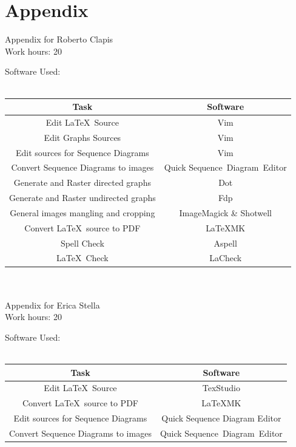 \documentclass{article}
\begin{document}
\section{Appendix}
Appendix for Roberto Clapis\\
Work hours: 20
\begin{center}
	Software Used:\\
	\-\\
	\begin{tabular}{*{2}{c}}
		\toprule
		Task & Software \\
		\midrule
		Edit \LaTeX\ Source & Vim\\
		Edit Graphs Sources & Vim\\
		Edit sources for Sequence Diagrams & Vim\\
		Convert Sequence Diagrams to images & Quick Sequence Diagram Editor\\
		Generate and Raster directed graphs& Dot\\
		Generate and Raster undirected graphs& Fdp\\
		General images mangling and cropping & ImageMagick \& Shotwell\\
		Convert \LaTeX\ source to PDF & \LaTeX\-MK\\
		Spell Check & Aspell \\
		\LaTeX\ Check & LaCheck\\
		\bottomrule
	\end{tabular}
\end{center}
\-\\
\-\\
Appendix for Erica Stella\\
Work hours: 20
\begin{center}
	Software Used:\\
	\-\\
	\begin{tabular}{*{2}{c}}
		\toprule
		Task & Software \\
		\midrule
		Edit \LaTeX\ Source & TexStudio\\
		Convert \LaTeX\ source to PDF & \LaTeX\-MK\\
		Edit sources for Sequence Diagrams & Quick Sequence Diagram Editor\\
		Convert Sequence Diagrams to images & Quick Sequence Diagram Editor\\
		\bottomrule
	\end{tabular}
\end{center}
\end{document}
